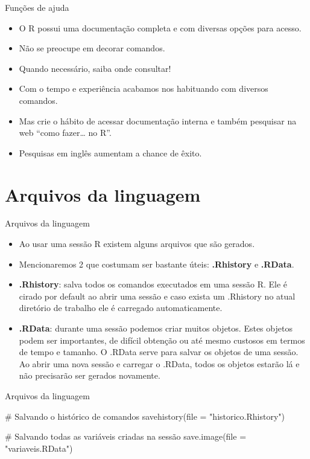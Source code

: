 \documentclass[
  ignorenonframetext,
  serif,
  professionalfont,
  usenames,
  dvipsnames,
  aspectratio = 169]{beamer}
\newenvironment{Shaded}{}{}
\newcommand{\AttributeTok}[1]{#1}
\newcommand{\CommentTok}[1]{\textcolor[rgb]{0.00,0.50,0.00}{#1}}
\newcommand{\FunctionTok}[1]{#1}
\newcommand{\NormalTok}[1]{#1}
\newcommand{\StringTok}[1]{\textcolor[rgb]{0.00,0.50,0.50}{#1}}
\renewenvironment{Shaded}{
    \vspace{2pt}
    \begin{tcolorbox}[
      boxrule=0pt,      %
      colframe=gray!10, %
      colback=gray!10,  %
      arc=1em,          %
      sharp corners,
      boxsep=0.5em,     %
      left=3pt, right=3pt, top=3pt, bottom=3pt, %
      grow to left by=0mm,
      grow to right by=6pt,
      ]
    }{
    \end{tcolorbox}
    \vspace{-3pt}
    }
\begin{document}
\begin{frame}{Funções de ajuda}
\label{funuxe7uxf5es-de-ajuda-5}
\begin{itemize}
\item
  O R possui uma documentação completa e com diversas opções para
  acesso.
\item
  Não se preocupe em decorar comandos.
\item
  Quando necessário, saiba onde consultar!
\item
  Com o tempo e experiência acabamos nos habituando com diversos
  comandos.
\item
  Mas crie o hábito de acessar documentação interna e também pesquisar
  na web ``como fazer\ldots{} no R''.
\item
  Pesquisas em inglês aumentam a chance de êxito.
\end{itemize}
\end{frame}

\section{Arquivos da linguagem}\label{arquivos-da-linguagem}

\begin{frame}{Arquivos da linguagem}
\label{arquivos-da-linguagem-1}
\begin{itemize}
\item
  Ao usar uma sessão R existem alguns arquivos que são gerados.
\item
  Mencionaremos 2 que costumam ser bastante úteis: \textbf{.Rhistory} e
  \textbf{.RData}.
\item
  \textbf{.Rhistory}: salva todos os comandos executados em uma sessão
  R. Ele é cirado por default ao abrir uma sessão e caso exista um
  .Rhistory no atual diretório de trabalho ele é carregado
  automaticamente.
\item
  \textbf{.RData}: durante uma sessão podemos criar muitos objetos.
  Estes objetos podem ser importantes, de difícil obtenção ou até mesmo
  custosos em termos de tempo e tamanho. O .RData serve para salvar os
  objetos de uma sessão. Ao abrir uma nova sessão e carregar o .RData,
  todos os objetos estarão lá e não precisarão ser gerados novamente.
\end{itemize}
\end{frame}

\begin{frame}[fragile]{Arquivos da linguagem}
\label{arquivos-da-linguagem-2}
\begin{Shaded}
\begin{Highlighting}[]
\CommentTok{\# Salvando o histórico de comandos}
\FunctionTok{savehistory}\NormalTok{(}\AttributeTok{file =} \StringTok{"historico.Rhistory"}\NormalTok{)}

\CommentTok{\# Salvando todas as variáveis criadas na sessão}
\FunctionTok{save.image}\NormalTok{(}\AttributeTok{file =} \StringTok{"variaveis.RData"}\NormalTok{)}
\end{Highlighting}
\end{Shaded}
\end{frame}
\end{document}
